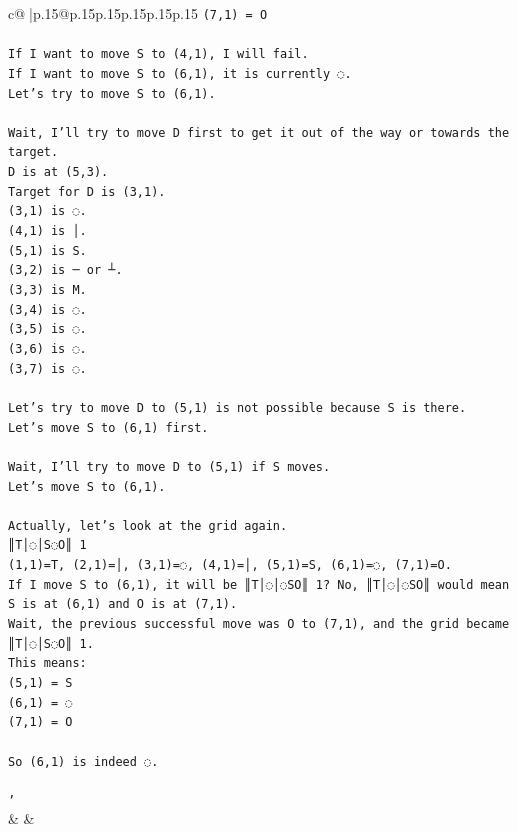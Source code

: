 \documentclass{article}
\begin{document}
{\begin{supertabular}{c@{$\;$}|p{.15\linewidth}@{}p{.15\linewidth}p{.15\linewidth}p{.15\linewidth}p{.15\linewidth}p{.15\linewidth}}
{{{\texttt{(7,1) = O} \\
\\ 
\texttt{If I want to move S to (4,1), I will fail.} \\
\texttt{If I want to move S to (6,1), it is currently ◌.} \\
\texttt{Let's try to move S to (6,1).} \\
\\ 
\texttt{Wait, I'll try to move D first to get it out of the way or towards the target.} \\
\texttt{D is at (5,3).} \\
\texttt{Target for D is (3,1).} \\
\texttt{(3,1) is ◌.} \\
\texttt{(4,1) is │.} \\
\texttt{(5,1) is S.} \\
\texttt{(3,2) is ─ or ┴.} \\
\texttt{(3,3) is M.} \\
\texttt{(3,4) is ◌.} \\
\texttt{(3,5) is ◌.} \\
\texttt{(3,6) is ◌.} \\
\texttt{(3,7) is ◌.} \\
\\ 
\texttt{Let's try to move D to (5,1) is not possible because S is there.} \\
\texttt{Let's move S to (6,1) first.} \\
\\ 
\texttt{Wait, I'll try to move D to (5,1) if S moves.} \\
\texttt{Let's move S to (6,1).} \\
\\ 
\texttt{Actually, let's look at the grid again.} \\
\texttt{║T│◌│S◌O║ 1} \\
\texttt{(1,1)=T, (2,1)=│, (3,1)=◌, (4,1)=│, (5,1)=S, (6,1)=◌, (7,1)=O.} \\
\texttt{If I move S to (6,1), it will be ║T│◌│◌SO║ 1? No, ║T│◌│◌SO║ would mean S is at (6,1) and O is at (7,1).} \\
\texttt{Wait, the previous successful move was O to (7,1), and the grid became ║T│◌│S◌O║ 1.} \\
\texttt{This means:} \\
\texttt{(5,1) = S} \\
\texttt{(6,1) = ◌} \\
\texttt{(7,1) = O} \\
\\ 
\texttt{So (6,1) is indeed ◌.} \\
\\ 
\texttt{'} \\
            }
        }
    }
    & & \\ \\


\end{supertabular}}
\end{document}
